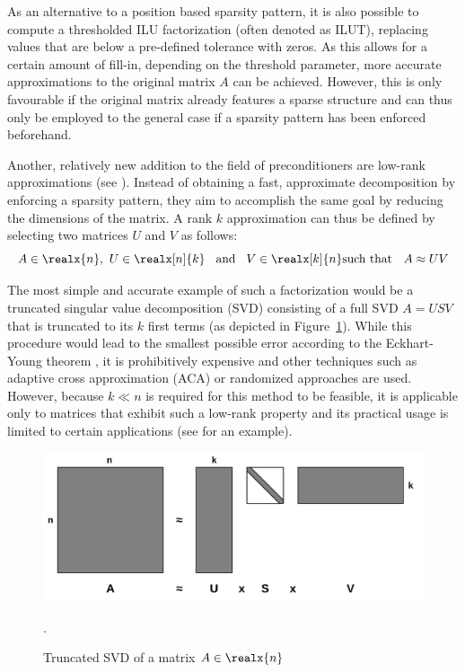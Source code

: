 As an alternative to a position based sparsity pattern, it is also possible to compute a thresholded ILU factorization (often denoted as ILUT), replacing values that are below a pre-defined tolerance with zeros. As this allows for a certain amount of fill-in, depending on the threshold parameter, more accurate approximations to the original matrix $A$ can be achieved. However, this is only favourable if the original matrix already features a sparse structure and can thus only be employed to the general case if a sparsity pattern has been enforced beforehand.

Another, relatively new addition to the field of preconditioners are low-rank approximations (see \cite{markovsky_low_2011}). Instead of obtaining a fast, approximate decomposition by enforcing a sparsity pattern, they aim to accomplish the same goal by reducing the dimensions of the matrix. A rank $k$ approximation can thus be defined by selecting two matrices $U$ and $V$ as follows:
\begin{equation}
    A \in \realx{n}\text{,}\:\; U \in \realx[n]{k}\;\; \text{ and }\;\; V \in \realx[k]{n}
    \text{such that }\;\ A \approx UV
\end{equation}

\noindent The most simple and accurate example of such a factorization would be a truncated singular value decomposition (SVD) consisting of a full SVD $A=USV$ that is truncated to its $k$ first terms (as depicted in Figure~\hyperref[fig:svd]{\ref{fig:svd}}). While this procedure would lead to the smallest possible error according to the Eckhart-Young theorem \cite{eckart_approximation_1936}, it is prohibitively expensive and other techniques such as adaptive cross approximation (ACA) \cite{rjasanow_adaptive_2000} or randomized approaches \cite{martinsson_randomized_2019} are used. However, because $k \ll n$ is required for this method to be feasible, it is applicable only to matrices that exhibit such a low-rank property and its practical usage is limited to certain applications (see \cite{higham_new_2019} for an example).

\begin{figure}[h]
    \centering
    \includegraphics[width=0.7\linewidth]{figures/SVD.pdf}
    \caption[Truncated SVD]{Truncated SVD of a matrix $A \in \realx{n}$}.
    \label{fig:svd}
\end{figure}


